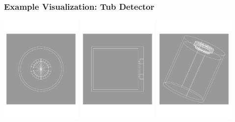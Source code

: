 \documentclass[xcolor=dvipsnames]{beamer}
\begin{document}
\begin{frame}[fragile]
  \frametitle{Example Visualization: Tub Detector}

  \vspace{-5mm}

  \begin{center}
    \includegraphics[width=0.3\textwidth]{tubdet-top}
    \includegraphics[width=0.3\textwidth]{tubdet-side}
    \includegraphics[width=0.3\textwidth]{tubdet-iso}
  \end{center}

  \vspace{-5mm}


\end{frame}
\end{document}
